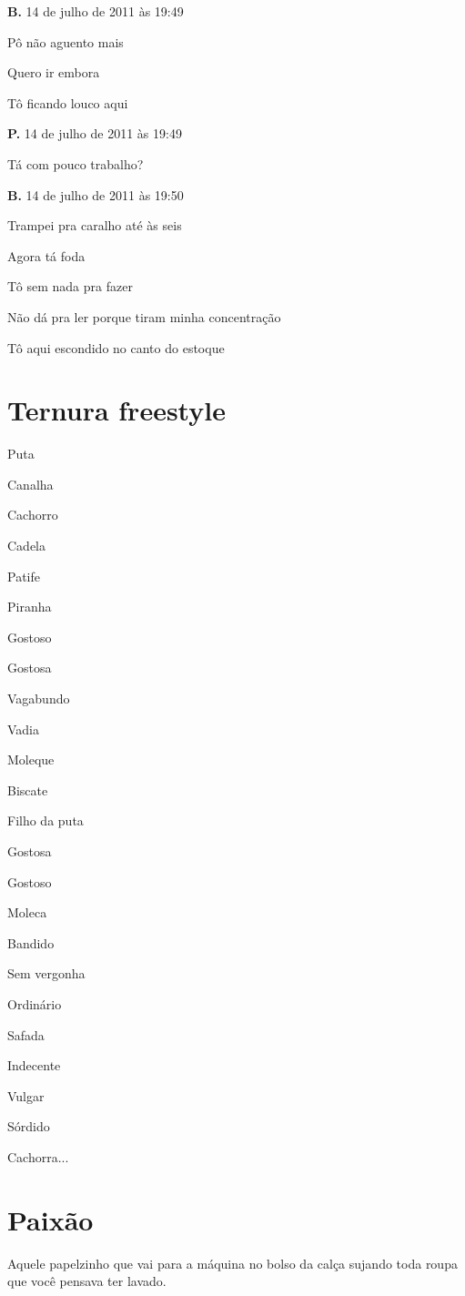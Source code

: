 {\textbf{B.} 14 de julho de 2011 às 19:49

Pô não aguento mais

Quero ir embora

Tô ficando louco aqui

\textbf{P.} 14 de julho de 2011 às 19:49

Tá com pouco trabalho?

\textbf{B.} 14 de julho de 2011 às 19:50

Trampei pra caralho até às seis

Agora tá foda

Tô sem nada pra fazer

Não dá pra ler porque tiram minha concentração

Tô aqui escondido no canto do estoque
}

\chapter{Ternura freestyle}

{\parindent0pt
Puta

Canalha

Cachorro

Cadela

Patife

Piranha

Gostoso

Gostosa

Vagabundo

Vadia

Moleque

Biscate

Filho da puta

Gostosa

Gostoso

Moleca

Bandido

Sem vergonha

Ordinário

Safada

Indecente

Vulgar

Sórdido

Cachorra...
}

\chapter{Paixão}

Aquele papelzinho que vai para a máquina no bolso da calça sujando toda
roupa que você pensava ter lavado.

